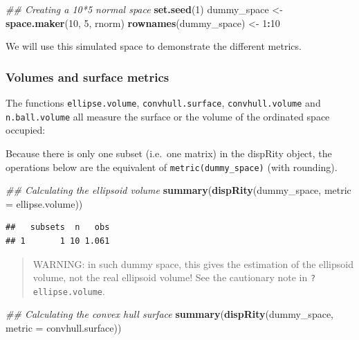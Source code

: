 \documentclass[
]{book}
\newenvironment{Shaded}{\begin{snugshade}}{\end{snugshade}}
\newcommand{\CommentTok}[1]{\textcolor[rgb]{0.56,0.35,0.01}{\textit{#1}}}
\newcommand{\DataTypeTok}[1]{\textcolor[rgb]{0.13,0.29,0.53}{#1}}
\newcommand{\DecValTok}[1]{\textcolor[rgb]{0.00,0.00,0.81}{#1}}
\newcommand{\KeywordTok}[1]{\textcolor[rgb]{0.13,0.29,0.53}{\textbf{#1}}}
\newcommand{\NormalTok}[1]{#1}
\newcommand{\OperatorTok}[1]{\textcolor[rgb]{0.81,0.36,0.00}{\textbf{#1}}}
\newcommand{\StringTok}[1]{\textcolor[rgb]{0.31,0.60,0.02}{#1}}
\begin{document}
\begin{Shaded}
\begin{Highlighting}[]
\CommentTok{\#\# Creating a 10*5 normal space}
\KeywordTok{set.seed}\NormalTok{(}\DecValTok{1}\NormalTok{)}
\NormalTok{dummy\_space \textless{}{-}}\StringTok{ }\KeywordTok{space.maker}\NormalTok{(}\DecValTok{10}\NormalTok{, }\DecValTok{5}\NormalTok{, rnorm)}
\KeywordTok{rownames}\NormalTok{(dummy\_space) \textless{}{-}}\StringTok{ }\DecValTok{1}\OperatorTok{:}\DecValTok{10}
\end{Highlighting}
\end{Shaded}

We will use this simulated space to demonstrate the different metrics.

\hypertarget{volumes-and-surface-metrics}{%
\subsubsection{Volumes and surface metrics}\label{volumes-and-surface-metrics}}

The functions \texttt{ellipse.volume}, \texttt{convhull.surface}, \texttt{convhull.volume} and \texttt{n.ball.volume} all measure the surface or the volume of the ordinated space occupied:

Because there is only one subset (i.e.~one matrix) in the dispRity object, the operations below are the equivalent of \texttt{metric(dummy\_space)} (with rounding).

\begin{Shaded}
\begin{Highlighting}[]
\CommentTok{\#\# Calculating the ellipsoid volume}
\KeywordTok{summary}\NormalTok{(}\KeywordTok{dispRity}\NormalTok{(dummy\_space, }\DataTypeTok{metric =}\NormalTok{ ellipse.volume))}
\end{Highlighting}
\end{Shaded}

\begin{verbatim}
##   subsets  n   obs
## 1       1 10 1.061
\end{verbatim}

\begin{quote}
WARNING: in such dummy space, this gives the estimation of the ellipsoid volume, not the real ellipsoid volume! See the cautionary note in \texttt{?ellipse.volume}.
\end{quote}

\begin{Shaded}
\begin{Highlighting}[]
\CommentTok{\#\# Calculating the convex hull surface}
\KeywordTok{summary}\NormalTok{(}\KeywordTok{dispRity}\NormalTok{(dummy\_space, }\DataTypeTok{metric =}\NormalTok{ convhull.surface))}
\end{Highlighting}
\end{Shaded}
\end{document}
